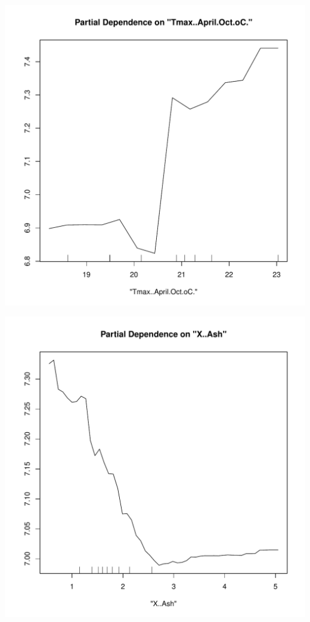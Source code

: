 \documentclass{article}\usepackage[]{graphicx}\usepackage[]{color}
\makeatletter
\def\maxwidth{ %
  \ifdim\Gin@nat@width>\linewidth
    \linewidth
  \else
    \Gin@nat@width
  \fi
}
\newenvironment{knitrout}{}{} %
\makeatother
\begin{document}
\begin{knitrout}
\color{fgcolor}

{\centering \includegraphics[width=\maxwidth]{figure/OtherPartialDependence-1} 

}




{\centering \includegraphics[width=\maxwidth]{figure/OtherPartialDependence-2} 

}
\end{knitrout}
\end{document}
